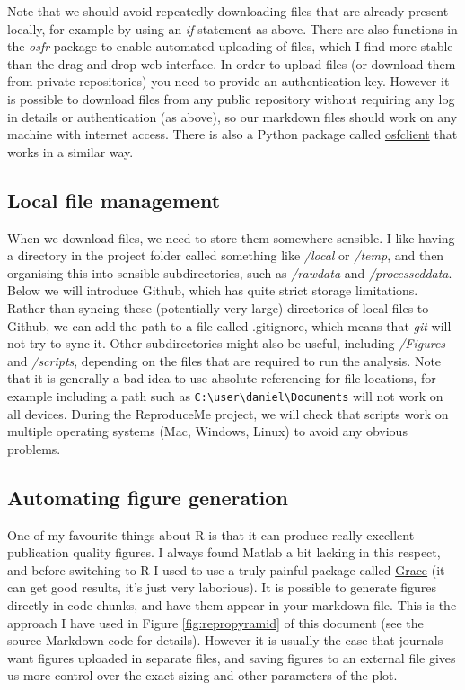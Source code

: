 \documentclass[
]{article}
\begin{document}
Note that we should avoid repeatedly downloading files that are already present locally, for example by using an \emph{if} statement as above. There are also functions in the \emph{osfr} package to enable automated uploading of files, which I find more stable than the drag and drop web interface. In order to upload files (or download them from private repositories) you need to provide an authentication key. However it is possible to download files from any public repository without requiring any log in details or authentication (as above), so our markdown files should work on any machine with internet access. There is also a Python package called \href{https://osfclient.readthedocs.io/en/latest/index.html}{osfclient} that works in a similar way.

\hypertarget{local-file-management}{%
\subsection{Local file management}\label{local-file-management}}

When we download files, we need to store them somewhere sensible. I like having a directory in the project folder called something like \emph{/local} or \emph{/temp}, and then organising this into sensible subdirectories, such as \emph{/rawdata} and \emph{/processeddata}. Below we will introduce Github, which has quite strict storage limitations. Rather than syncing these (potentially very large) directories of local files to Github, we can add the path to a file called .gitignore, which means that \emph{git} will not try to sync it. Other subdirectories might also be useful, including \emph{/Figures} and \emph{/scripts}, depending on the files that are required to run the analysis. Note that it is generally a bad idea to use absolute referencing for file locations, for example including a path such as \texttt{C:\textbackslash{}user\textbackslash{}daniel\textbackslash{}Documents} will not work on all devices. During the ReproduceMe project, we will check that scripts work on multiple operating systems (Mac, Windows, Linux) to avoid any obvious problems.

\hypertarget{automating-figure-generation}{%
\subsection{Automating figure generation}\label{automating-figure-generation}}

One of my favourite things about R is that it can produce really excellent publication quality figures. I always found Matlab a bit lacking in this respect, and before switching to R I used to use a truly painful package called \href{https://plasma-gate.weizmann.ac.il/Grace/}{Grace} (it can get good results, it's just very laborious). It is possible to generate figures directly in code chunks, and have them appear in your markdown file. This is the approach I have used in Figure \ref{fig:repropyramid} of this document (see the source Markdown code for details). However it is usually the case that journals want figures uploaded in separate files, and saving figures to an external file gives us more control over the exact sizing and other parameters of the plot.
\end{document}

